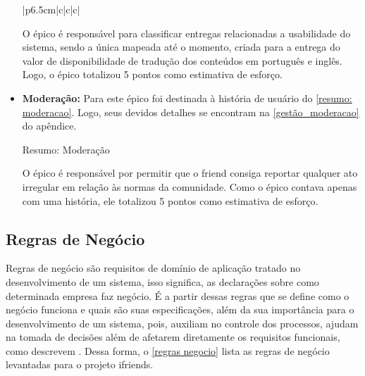 \begin{itemize}
\begin{quadro}[htb]
{\begin{tabular}{|p{6.5cm}|c|c|c|}
\end{tabular}}
\end{quadro}
\FloatBarrier 

O épico é responsável para classificar entregas relacionadas a usabilidade do sistema, sendo a única mapeada até o momento, criada para a entrega do valor de disponibilidade de tradução dos conteúdos em português e inglês. Logo, o épico totalizou 5 pontos como estimativa de esforço.

\item {\textbf{Moderação:}} Para este épico foi destinada à história de usuário do \autoref{resumo: moderacao}. Logo, seus devidos detalhes se encontram na \autoref{gestão_moderacao} do apêndice.

\def\arraystretch{2}
\begin{quadro}[htb]
\centering
\ABNTEXfontereduzida
\caption{Resumo: Moderação}
\label{resumo: moderacao}
\end{quadro}
\FloatBarrier 

O épico é responsável por permitir que o \gls{friend} consiga reportar qualquer ato irregular em relação às normas da comunidade. Como o épico contava apenas com uma história, ele totalizou 5 pontos como estimativa de esforço. 

\end{itemize}

\subsection{Regras de Negócio}
Regras de negócio são requisitos de domínio de aplicação tratado no desenvolvimento de um sistema, isso significa, as declarações sobre como determinada empresa faz negócio. É a partir dessas regras que se define como o negócio funciona e quais são suas especificações, além da sua importância para o desenvolvimento de um sistema, pois, auxiliam no controle dos processos, ajudam na tomada de decisões além de afetarem diretamente os requisitos funcionais, como descrevem . Dessa forma, o \autoref{regras negocio} lista as regras de negócio levantadas para o projeto \gls{ifriends}.

